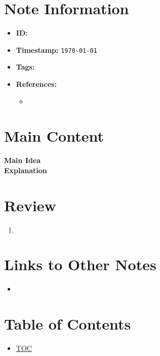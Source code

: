 \clearpage
{}
\label{}
\renewcommand{\notetitle}{}

\section*{Note Information}
\begin{itemize}
  \item \textbf{ID:} \texttt{}
  \item \textbf{Timestamp:} \texttt{\today \ \currenttime}
  \item \textbf{Tags:} \texttt{}
  \item \textbf{References:}
    \begin{itemize}
      \item \href{}{}
    \end{itemize}
\end{itemize}


\section*{Main Content}
\textbf{Main Idea}\\

\textbf{Explanation}\\


\section*{Review}
\begin{enumerate}
  \item 
\end{enumerate}


\section*{Links to Other Notes}
\begin{itemize}
  \item \hyperref[]{}
\end{itemize}

\section*{Table of Contents}

\begin{itemize}
  \item \hyperref[toc]{TOC}
\end{itemize}

